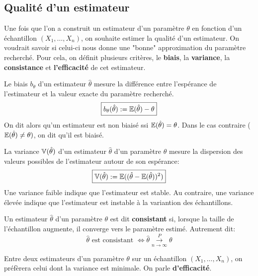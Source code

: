 \subsection{Qualité d'un estimateur}

Une fois que l'on a construit un estimateur d'un paramètre $\theta$ en fonction d'un échantillon 
$(X_1, \dots, X_n)$, on souhaite estimer la qualité d'un estimateur. On voudrait savoir si celui-ci nous donne 
une "bonne" approximation du paramètre recherché. 
Pour cela, on définit plusieurs critères, le \textbf{biais}, la \textbf{variance}, la \textbf{consistance} et \textbf{l'efficacité} 
de cet estimateur. 

\begin{definition}
    Le biais $b_\theta$ d'un estimateur $\hat{\theta}$ mesure la différence entre l'espérance de l'estimateur 
    et la valeur exacte du paramètre recherché. 
        \[ \boxed{ b_\theta(\hat{\theta}) := \mathbb{E}(\hat{\theta}) - \theta } \] 
    On dit alors qu'un estimateur est non biaisé ssi $ \mathbb{E}(\hat{\theta}) = \theta$. 
    Dans le cas contraire ($\mathbb{E}(\hat{\theta}) \not = \theta)$, on dit qu'il est biaisé. 
\end{definition}

\begin{definition}
    La variance $\mathbb{V}(\hat{\theta})$ d'un estimateur $\hat{\theta}$ d'un paramètre $\theta$ mesure la dispersion 
    des valeurs possibles de l'estimateur autour de son espérance: 
        \[ \boxed{
            \mathbb{V}(\hat{\theta}) := \mathbb{E}((\hat{\theta} - \mathbb{E}(\hat{\theta}) )^2) 
        } \] 
    Une variance faible indique que l'estimateur est stable. Au contraire, une variance élevée indique que l'estimateur est 
    instable à la variantion des échantillons. 
\end{definition}

\begin{definition}[Consistance]
    Un estimateur $\hat{\theta}$ d'un paramètre $\theta$ est dit \textbf{consistant} si, lorsque la taille de l'échantillon 
    augmente, il converge vers le paramètre estimé. Autrement dit: 
        \[ \hat{\theta} \text{ est consistant } \iff \hat{\theta} \overset{P}{\underset{n \to \infty}{\longrightarrow}} \theta \] 
\end{definition}

\begin{proposition}
    Entre deux estimateurs d'un paramètre $\theta$ sur un échantillon $(X_1, \dots, X_n)$, on préfèrera 
    celui dont la variance est minimale. On parle \textbf{d'efficacité}. 
\end{proposition}

